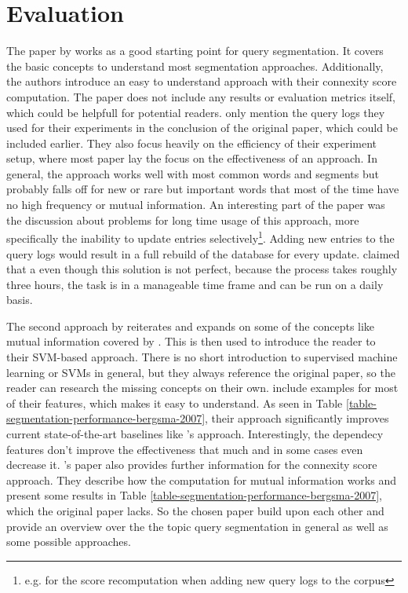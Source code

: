 \section{Evaluation} \label{evaluation}

The paper by \citeauthor{Risvik:2003} works as a good starting point for query segmentation. It covers the basic concepts to understand most segmentation approaches. Additionally, the authors introduce an easy to understand approach with their connexity score computation. The paper does not include any results or evaluation metrics itself, which could be helpfull for potential readers. \citeauthor{Risvik:2003} only mention the query logs they used for their experiments in the conclusion of the original paper, which could be included earlier. They also focus heavily on the efficiency of their experiment setup, where most paper lay the focus on the effectiveness of an approach. In general, the approach works well with most common words and segments but probably falls off for new or rare but important words that most of the time have no high frequency or mutual information. 
An interesting part of the paper was the discussion about problems for long time usage of this approach, more specifically the inability to update entries selectively\footnote{e.g. for the score recomputation when adding new query logs to the corpus}. Adding new entries to the query logs would result in a full rebuild of the database for every update. \citeauthor{Risvik:2003} claimed that a even though this solution is not perfect, because the process takes roughly three hours, the task is in a manageable time frame and can be run on a daily basis.


The second approach by \citeauthor{Bergsma:2007} reiterates and expands on some of the concepts like mutual information covered by \citeauthor{Risvik:2003}. This is then used to introduce the reader to their SVM-based approach. There is no short introduction to supervised machine learning or SVMs in general, but they always reference the original paper, so the reader can research the missing concepts on their own. \citeauthor{Bergsma:2007} include examples for most of their features, which makes it easy to understand. As seen in Table \ref{table-segmentation-performance-bergsma-2007}, their approach significantly improves current state-of-the-art baselines like \citeauthor{Risvik:2003}'s approach. Interestingly, the dependecy features don't improve the effectiveness that much and in some cases even decrease it.
\citeauthor{Bergsma:2007}'s paper also provides further information for the connexity score approach. They describe how the computation for mutual information works and present some results in Table \ref{table-segmentation-performance-bergsma-2007}, which the original paper lacks. So the chosen paper build upon each other and provide an overview over the the topic query segmentation in general as well as some possible approaches.
